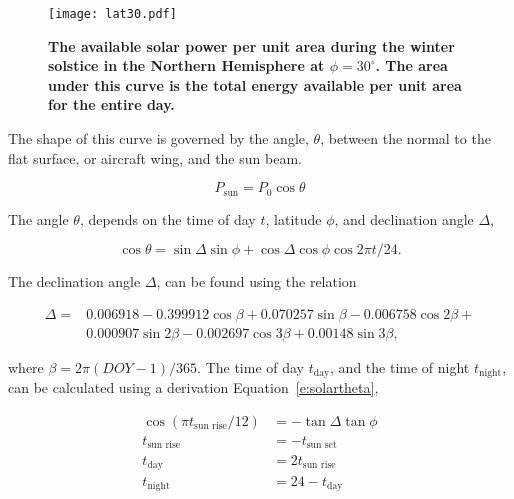 \documentclass[]{aiaa-tc}%
\begin{document}
\begin{figure}[H]
	\begin{center}
	\texttt{[image: lat30.pdf]}
    \caption{ \textbf{ The available solar power per unit area during the winter solstice in the Northern Hemisphere at $\phi=30^{\circ}$.  The area under this curve is the total energy available per unit area for the entire day.} }
	\label{f:lat45}
	\end{center}
\end{figure}

The shape of this curve is governed by the angle, $\theta$, between the normal to the flat surface, or aircraft wing, and the sun beam.\cite{solar}

\begin{equation}
    \label{e:solarp}
    P_{\text{sun}} = P_0 \cos{\theta}
\end{equation}

The angle $\theta$, depends on the time of day $t$, latitude $\phi$, and declination angle $\Delta$,\cite{solar}

    \begin{equation}
        \label{e:solartheta}
        \cos{\theta} = \sin{\Delta} \sin{\phi} + \cos{\Delta} \cos{\phi} \cos{2\pi t/24}.
    \end{equation}

 The declination angle $\Delta$, can be found using the relation\cite{solar} 

    \begin{align}
        \label{e:solardelta}
        \Delta = &0.006918 - 0.399912 \cos{\beta} + 0.070257\sin{\beta} - 0.006758\cos{2\beta} + \nonumber \\
        & 0.000907\sin{2\beta} - 0.002697\cos{3\beta} + 0.00148\sin{3\beta},
    \end{align}

    where $\beta = 2\pi (DOY-1)/365$.
    The time of day $t_{\text{day}}$, and the time of night $t_{\text{night}}$, can be calculated using a derivation Equation~\eqref{e:solartheta}, \cite{solar}

    \begin{align}
        \label{e:solartday}
        \cos{(\pi t_{\text{sun rise}}/12)} &= -\tan{\Delta} \tan{\phi} \\
        \label{e:solarsunrise}
        t_{\text{sun rise}} &= -t_{\text{sun set}} \\
        \label{e:solartday2}
        t_{\text{day}} &= 2t_{\text{sun rise}} \\
        \label{e:solartnight}
        t_{\text{night}} &= 24 - t_{\text{day}}
    \end{align}
\end{document}
